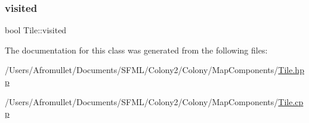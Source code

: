 \mbox{\label{class_tile_a6fc86234519f692394d5c3214a220a0f}} 
\subsubsection{\texorpdfstring{visited}{visited}}
{\footnotesize\ttfamily bool Tile\+::visited\hspace{0.3cm}{\ttfamily [private]}}



The documentation for this class was generated from the following files\+:\begin{DoxyCompactItemize}
\item 
/\+Users/\+Afromullet/\+Documents/\+S\+F\+M\+L/\+Colony2/\+Colony/\+Map\+Components/\mbox{\hyperlink{_tile_8hpp}{Tile.\+hpp}}\item 
/\+Users/\+Afromullet/\+Documents/\+S\+F\+M\+L/\+Colony2/\+Colony/\+Map\+Components/\mbox{\hyperlink{_tile_8cpp}{Tile.\+cpp}}\end{DoxyCompactItemize}
